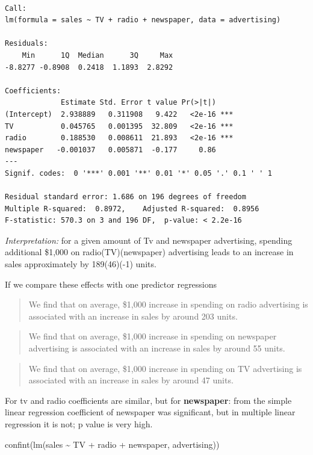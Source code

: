 \documentclass[
  letterpaper,
  DIV=11,
  numbers=noendperiod]{scrreprt}
\newenvironment{Shaded}{\begin{snugshade}}{\end{snugshade}}
\newcommand{\FunctionTok}[1]{\textcolor[rgb]{0.02,0.16,0.49}{#1}}
\newcommand{\NormalTok}[1]{\textcolor[rgb]{0.33,0.33,0.33}{#1}}
\newcommand{\SpecialCharTok}[1]{\textcolor[rgb]{0.00,0.46,0.62}{#1}}
\begin{document}
\begin{verbatim}

Call:
lm(formula = sales ~ TV + radio + newspaper, data = advertising)

Residuals:
    Min      1Q  Median      3Q     Max 
-8.8277 -0.8908  0.2418  1.1893  2.8292 

Coefficients:
             Estimate Std. Error t value Pr(>|t|)    
(Intercept)  2.938889   0.311908   9.422   <2e-16 ***
TV           0.045765   0.001395  32.809   <2e-16 ***
radio        0.188530   0.008611  21.893   <2e-16 ***
newspaper   -0.001037   0.005871  -0.177     0.86    
---
Signif. codes:  0 '***' 0.001 '**' 0.01 '*' 0.05 '.' 0.1 ' ' 1

Residual standard error: 1.686 on 196 degrees of freedom
Multiple R-squared:  0.8972,    Adjusted R-squared:  0.8956 
F-statistic: 570.3 on 3 and 196 DF,  p-value: < 2.2e-16
\end{verbatim}

\emph{Interpretation:} for a given amount of Tv and newspaper
advertising, spending additional \$1,000 on radio(TV)(newspaper)
advertising leads to an increase in sales approximately by 189(46)(-1)
units.

If we compare these effects with one predictor regressions

\begin{quote}
We find that on average, \$1,000 increase in spending on radio
advertising is associated with an increase in sales by around 203 units.
\end{quote}

\begin{quote}
We find that on average, \$1,000 increase in spending on newspaper
advertising is associated with an increase in sales by around 55 units.
\end{quote}

\begin{quote}
We find that on average, \$1,000 increase in spending on TV advertising
is associated with an increase in sales by around 47 units.
\end{quote}

For tv and radio coefficients are similar, but for \textbf{newspaper}:
from the simple linear regression coefficient of newspaper was
significant, but in multiple linear regression it is not; p value is
very high.

\begin{Shaded}
\begin{Highlighting}[]
\FunctionTok{confint}\NormalTok{(}\FunctionTok{lm}\NormalTok{(sales }\SpecialCharTok{\textasciitilde{}}\NormalTok{ TV }\SpecialCharTok{+}\NormalTok{ radio }\SpecialCharTok{+}\NormalTok{ newspaper, advertising))}
\end{Highlighting}
\end{Shaded}
\end{document}
